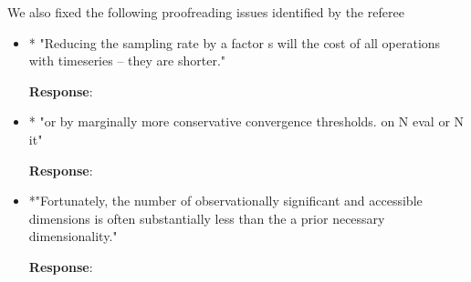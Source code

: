 \documentclass[onecolumn]{revtex4}
\begin{document}
We also fixed the following proofreading issues identified by the referee
\begin{itemize}


\item * "Reducing the sampling rate by a factor s will the cost of all
operations with timeseries – they are shorter."

\noindent \textbf{Response}:


\item * "or by marginally more conservative convergence thresholds. on N
eval or N it"

\noindent \textbf{Response}:

\item *"Fortunately, the number of observationally significant and
accessible dimensions is often substantially less than the a prior
necessary dimensionality."

\noindent \textbf{Response}:

\end{itemize}
\end{document}
